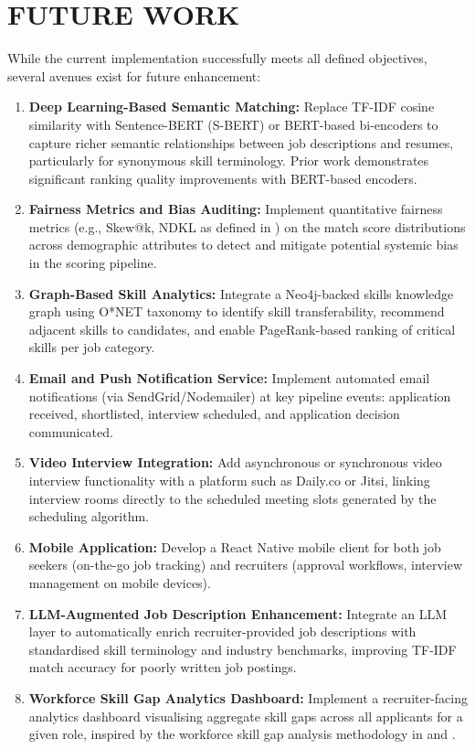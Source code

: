 \documentclass[12pt,a4paper]{report}
\begin{document}
\section{FUTURE WORK}

While the current implementation successfully meets all defined objectives, several avenues exist for future enhancement:

\begin{enumerate}[leftmargin=*, label=\arabic*., itemsep=3pt]
    \item \textbf{Deep Learning-Based Semantic Matching:} Replace TF-IDF cosine similarity with Sentence-BERT (S-BERT) or BERT-based bi-encoders to capture richer semantic relationships between job descriptions and resumes, particularly for synonymous skill terminology. Prior work \cite{ref7} demonstrates significant ranking quality improvements with BERT-based encoders.
    \item \textbf{Fairness Metrics and Bias Auditing:} Implement quantitative fairness metrics (e.g., Skew@k, NDKL as defined in \cite{ref12}) on the match score distributions across demographic attributes to detect and mitigate potential systemic bias in the scoring pipeline.
    \item \textbf{Graph-Based Skill Analytics:} Integrate a Neo4j-backed skills knowledge graph using O*NET taxonomy \cite{ref20} to identify skill transferability, recommend adjacent skills to candidates, and enable PageRank-based ranking of critical skills per job category.
    \item \textbf{Email and Push Notification Service:} Implement automated email notifications (via SendGrid/Nodemailer) at key pipeline events: application received, shortlisted, interview scheduled, and application decision communicated.
    \item \textbf{Video Interview Integration:} Add asynchronous or synchronous video interview functionality with a platform such as Daily.co or Jitsi, linking interview rooms directly to the scheduled meeting slots generated by the scheduling algorithm.
    \item \textbf{Mobile Application:} Develop a React Native mobile client for both job seekers (on-the-go job tracking) and recruiters (approval workflows, interview management on mobile devices).
    \item \textbf{LLM-Augmented Job Description Enhancement:} Integrate an LLM layer to automatically enrich recruiter-provided job descriptions with standardised skill terminology and industry benchmarks, improving TF-IDF match accuracy for poorly written job postings.
    \item \textbf{Workforce Skill Gap Analytics Dashboard:} Implement a recruiter-facing analytics dashboard visualising aggregate skill gaps across all applicants for a given role, inspired by the workforce skill gap analysis methodology in \cite{ref19} and \cite{ref20}.
\end{enumerate}
\end{document}

